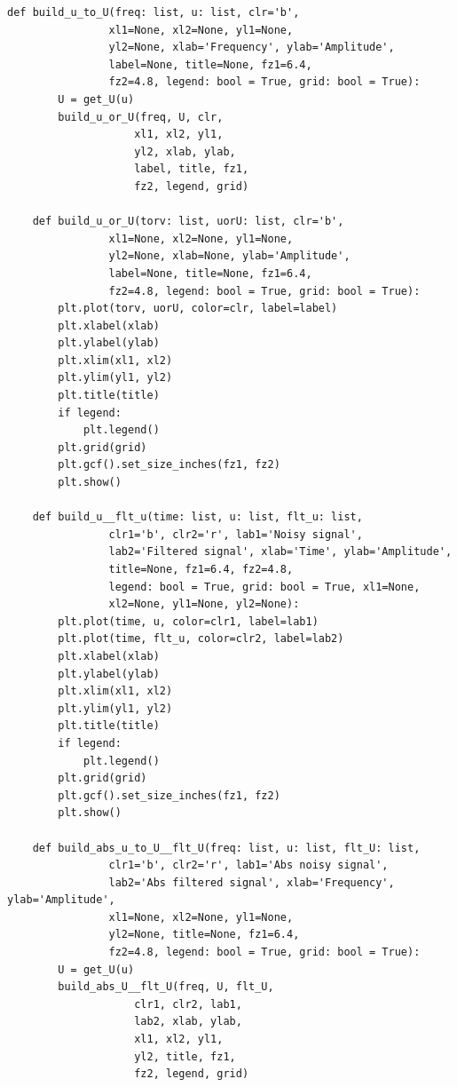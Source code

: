 \documentclass[a4paper, 12pt]{article}
\begin{document}
    \begin{lstlisting}[label=l3, caption={Файл builder.py. Реализация построения графиков.}]
    def build_u_to_U(freq: list, u: list, clr='b',
                xl1=None, xl2=None, yl1=None,
                yl2=None, xlab='Frequency', ylab='Amplitude',
                label=None, title=None, fz1=6.4, 
                fz2=4.8, legend: bool = True, grid: bool = True):
        U = get_U(u)
        build_u_or_U(freq, U, clr,
                    xl1, xl2, yl1,
                    yl2, xlab, ylab,
                    label, title, fz1, 
                    fz2, legend, grid)

    def build_u_or_U(torv: list, uorU: list, clr='b',
                xl1=None, xl2=None, yl1=None,
                yl2=None, xlab=None, ylab='Amplitude',
                label=None, title=None, fz1=6.4, 
                fz2=4.8, legend: bool = True, grid: bool = True):
        plt.plot(torv, uorU, color=clr, label=label)
        plt.xlabel(xlab)
        plt.ylabel(ylab)
        plt.xlim(xl1, xl2)
        plt.ylim(yl1, yl2)
        plt.title(title)
        if legend:
            plt.legend()
        plt.grid(grid)
        plt.gcf().set_size_inches(fz1, fz2)
        plt.show()

    def build_u__flt_u(time: list, u: list, flt_u: list,
                clr1='b', clr2='r', lab1='Noisy signal',
                lab2='Filtered signal', xlab='Time', ylab='Amplitude',
                title=None, fz1=6.4, fz2=4.8, 
                legend: bool = True, grid: bool = True, xl1=None, 
                xl2=None, yl1=None, yl2=None):
        plt.plot(time, u, color=clr1, label=lab1)
        plt.plot(time, flt_u, color=clr2, label=lab2)
        plt.xlabel(xlab)
        plt.ylabel(ylab)
        plt.xlim(xl1, xl2)
        plt.ylim(yl1, yl2)
        plt.title(title)
        if legend:
            plt.legend()
        plt.grid(grid)
        plt.gcf().set_size_inches(fz1, fz2)
        plt.show()

    def build_abs_u_to_U__flt_U(freq: list, u: list, flt_U: list,
                clr1='b', clr2='r', lab1='Abs noisy signal',
                lab2='Abs filtered signal', xlab='Frequency', ylab='Amplitude',
                xl1=None, xl2=None, yl1=None, 
                yl2=None, title=None, fz1=6.4, 
                fz2=4.8, legend: bool = True, grid: bool = True):
        U = get_U(u)
        build_abs_U__flt_U(freq, U, flt_U, 
                    clr1, clr2, lab1, 
                    lab2, xlab, ylab, 
                    xl1, xl2, yl1, 
                    yl2, title, fz1, 
                    fz2, legend, grid)


\end{lstlisting}
\end{document}
